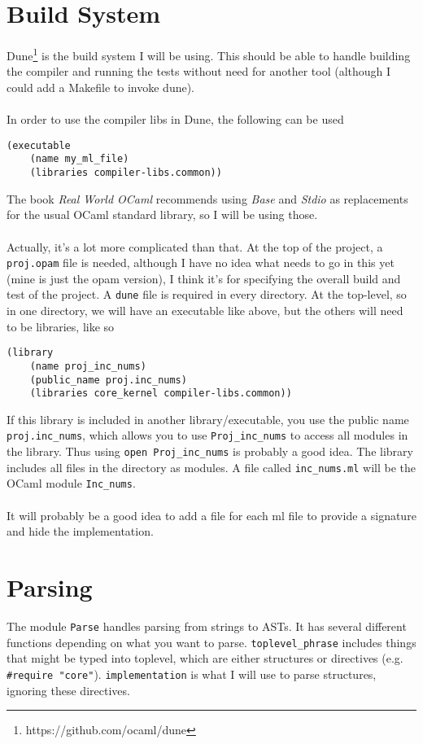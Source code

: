 \documentclass{report}
\newcommand{\textinline}{\texttt}
\newcommand{\camlinline}{\texttt}
\begin{document}
\section{Build System}
Dune\footnote{https://github.com/ocaml/dune} is the build system I will be using. This should be able to handle building the compiler and running the tests without need for another tool (although I could add a Makefile to invoke dune).
\\\\
In order to use the compiler libs in Dune, the following can be used
\begin{verbatim}
(executable
	(name my_ml_file)
	(libraries compiler-libs.common))
\end{verbatim}
The book \textit{Real World OCaml} recommends using \textit{Base} and \textit{Stdio} as replacements for the usual OCaml standard library, so I will be using those.
\\\\
Actually, it's a lot more complicated than that. At the top of the project, a \textinline{proj.opam} file is needed, although I have no idea what needs to go in this yet (mine is just the opam version), I think it's for specifying the overall build and test of the project. A \textinline{dune} file is required in every directory. At the top-level, so in one directory, we will have an executable like above, but the others will need to be libraries, like so
\begin{verbatim}
(library
    (name proj_inc_nums)
    (public_name proj.inc_nums)
    (libraries core_kernel compiler-libs.common))
\end{verbatim}
If this library is included in another library/executable, you use the public name \textinline{proj.inc_nums}, which allows you to use \textinline{Proj_inc_nums} to access all modules in the library. Thus using \camlinline{open Proj_inc_nums} is probably a good idea. The library includes all files in the directory as modules. A file called \textinline{inc_nums.ml} will be the OCaml module \textinline{Inc_nums}.
\\\\
It will probably be a good idea to add a  file for each ml file to provide a signature and hide the implementation.

\section{Parsing}
The module \camlinline{Parse} handles parsing from strings to ASTs. It has several different functions depending on what you want to parse. \camlinline{toplevel_phrase} includes things that might be typed into toplevel, which are either structures or directives (e.g. \camlinline{#require "core"}). \camlinline{implementation} is what I will use to parse structures, ignoring these directives.
\end{document}
